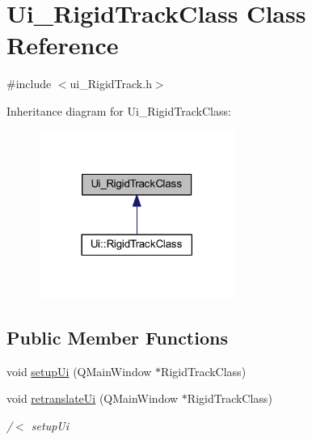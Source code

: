 \hypertarget{class_ui___rigid_track_class}{}\section{Ui\+\_\+\+Rigid\+Track\+Class Class Reference}
\label{class_ui___rigid_track_class}


{\ttfamily \#include $<$ui\+\_\+\+Rigid\+Track.\+h$>$}



Inheritance diagram for Ui\+\_\+\+Rigid\+Track\+Class\+:\nopagebreak
\begin{figure}[H]
\begin{center}
\leavevmode
\includegraphics[width=182pt]{class_ui___rigid_track_class__inherit__graph}
\end{center}
\end{figure}
\subsection*{Public Member Functions}
\begin{DoxyCompactItemize}
\item 
void \hyperlink{class_ui___rigid_track_class_a7f78fefc15716049b873bef4d3450e38}{setup\+Ui} (Q\+Main\+Window $\ast$Rigid\+Track\+Class)
\item 
void \hyperlink{class_ui___rigid_track_class_a7c96951c4e173848e7695d6bd7883af6}{retranslate\+Ui} (Q\+Main\+Window $\ast$Rigid\+Track\+Class)
\begin{DoxyCompactList}\small\item\em /$<$ setup\+Ui \end{DoxyCompactList}\end{DoxyCompactItemize}

